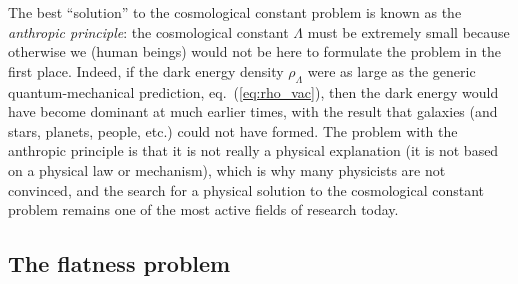 The best ``solution'' to the cosmological constant problem is known as the {\it anthropic principle}: the cosmological constant $\Lambda$ must be extremely small because otherwise we (human beings) would not be here to formulate the problem in the first place. Indeed, if the dark energy density $\rho_{\Lambda}$ were as large as the generic quantum-mechanical prediction, eq.\ (\ref{eq:rho_vac}), then the dark energy would have become dominant at much earlier times, with the result that galaxies (and stars, planets, people, etc.) could not have formed. The problem with the anthropic principle is that it is not really a physical explanation (it is not based on a physical law or mechanism), which is why many physicists are not convinced, and the search for a physical solution to the cosmological constant problem remains one of the most active fields of research today.

\subsection{The flatness problem}

